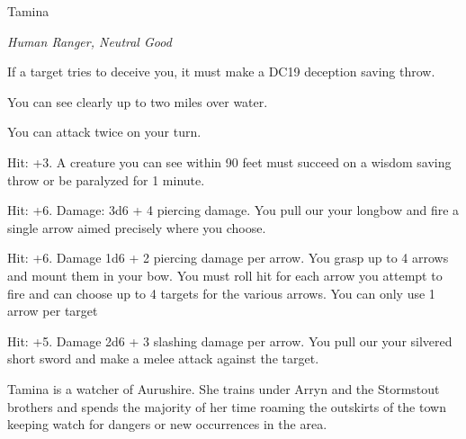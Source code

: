\begin{monsterbox}{Tamina}
	\begin{hangingpar}
		\textit{Human Ranger, Neutral Good}
	\end{hangingpar}
	\dndline%
	\basics[%
	armorclass = 18,
	hitpoints  = 154,
	speed      = 40 ft
	]
	\dndline%
	\stats[
	STR = \stat{18}, %
	DEX = \stat{18},
	CON = \stat{12},
	INT = \stat{14},
	WIS = \stat{13},
	CHA = \stat{11}
	]
	\dndline%
	\details[%
	languages = {Common, Elvish, Pandaren},
	challenge = 10
	]
	\dndline%
	\begin{monsteraction}
		If a target tries to deceive you, it must make a DC19 deception saving throw.
	\end{monsteraction}	
	\begin{monsteraction}
		You can see clearly up to two miles over water.
	\end{monsteraction}
	\begin{monsteraction}
		You can attack twice on your turn.
	\end{monsteraction}
	\begin{monsteraction}
		Hit: +3. A creature you can see within 90 feet must succeed on a wisdom saving throw or be paralyzed for 1 minute.
	\end{monsteraction}
	\begin{monsteraction}
		Hit: +6. Damage: 3d6 + 4 piercing damage. You pull our your longbow and fire a single arrow aimed precisely where you choose. 
	\end{monsteraction}
	\begin{monsteraction}
		Hit: +6. Damage 1d6 + 2 piercing damage per arrow. You grasp up to 4 arrows and mount them in your bow. You must roll hit for each arrow you attempt to fire and can choose up to 4 targets for the various arrows. You can only use 1 arrow per target
	\end{monsteraction}
	\begin{monsteraction}
		Hit: +5. Damage 2d6 + 3 slashing damage per arrow. You pull our your silvered short sword and make a melee attack against the target.
	\end{monsteraction}

	Tamina is a watcher of Aurushire. She trains under Arryn and the Stormstout brothers and spends the majority of her time roaming the outskirts of the town keeping watch for dangers or new occurrences in the area.
\end{monsterbox}

